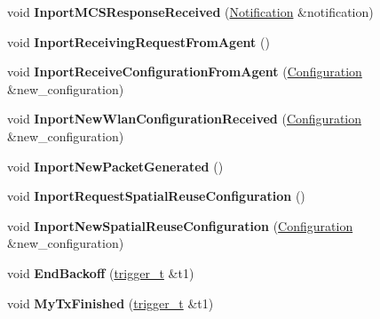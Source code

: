 \begin{DoxyCompactItemize}
\item 
\mbox{\label{classcompcxx__Node__23_aa0f9700ec25a2582bef7585cb28f0e20}} 
void {\bfseries Inport\+M\+C\+S\+Response\+Received} (\hyperlink{structNotification}{Notification} \&notification)
\item 
\mbox{\label{classcompcxx__Node__23_aa9b1bde0d5d1cdaae4fb946bbdbf54fe}} 
void {\bfseries Inport\+Receiving\+Request\+From\+Agent} ()
\item 
\mbox{\label{classcompcxx__Node__23_a3704423847e2e9e548991658fb4f287b}} 
void {\bfseries Inport\+Receive\+Configuration\+From\+Agent} (\hyperlink{structConfiguration}{Configuration} \&new\+\_\+configuration)
\item 
\mbox{\label{classcompcxx__Node__23_a03332ce11ae3c77536b797cbcb771438}} 
void {\bfseries Inport\+New\+Wlan\+Configuration\+Received} (\hyperlink{structConfiguration}{Configuration} \&new\+\_\+configuration)
\item 
\mbox{\label{classcompcxx__Node__23_ac2b395625927804def759634fa64fd62}} 
void {\bfseries Inport\+New\+Packet\+Generated} ()
\item 
\mbox{\label{classcompcxx__Node__23_a365a24a0b6a918028b3b1219cba4bd11}} 
void {\bfseries Inport\+Request\+Spatial\+Reuse\+Configuration} ()
\item 
\mbox{\label{classcompcxx__Node__23_aa617861d2d74ca4a2ee71680bf1989a0}} 
void {\bfseries Inport\+New\+Spatial\+Reuse\+Configuration} (\hyperlink{structConfiguration}{Configuration} \&new\+\_\+configuration)
\item 
\mbox{\label{classcompcxx__Node__23_a95f2ff1194f7a40d60336fa19097e525}} 
void {\bfseries End\+Backoff} (\hyperlink{classtrigger__t}{trigger\+\_\+t} \&t1)
\item 
\mbox{\label{classcompcxx__Node__23_a6a223f03ad7bb55398e9090e882251a5}} 
void {\bfseries My\+Tx\+Finished} (\hyperlink{classtrigger__t}{trigger\+\_\+t} \&t1)
\item 

\end{DoxyCompactItemize}
